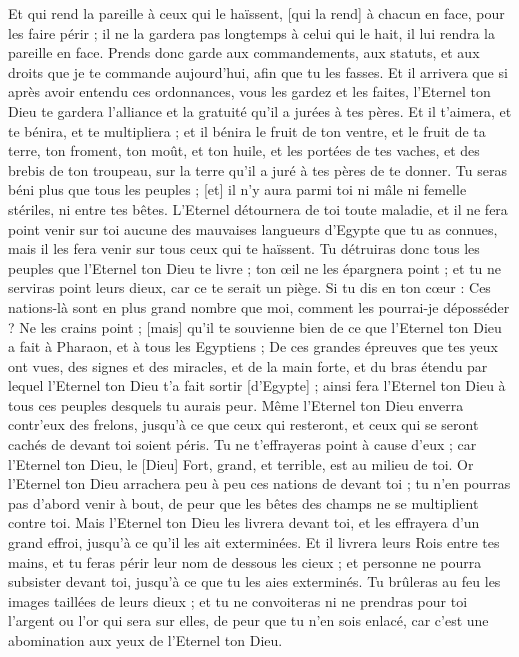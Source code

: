 \begin{multicols}{2}
Et qui rend la pareille à ceux qui le haïssent, [qui la rend] à chacun en face, pour les faire périr ; il ne la gardera pas longtemps à celui qui le hait, il lui rendra la pareille en face.
Prends donc garde aux commandements, aux statuts, et aux droits que je te commande aujourd'hui, afin que tu les fasses.
Et il arrivera que si après avoir entendu ces ordonnances, vous les gardez et les faites, l'Eternel ton Dieu te gardera l'alliance et la gratuité qu'il a jurées à tes pères.
Et il t'aimera, et te bénira, et te multipliera ; et il bénira le fruit de ton ventre, et le fruit de ta terre, ton froment, ton moût, et ton huile, et les portées de tes vaches, et des brebis de ton troupeau, sur la terre qu'il a juré à tes pères de te donner.
Tu seras béni plus que tous les peuples ; [et] il n'y aura parmi toi ni mâle ni femelle stériles, ni entre tes bêtes.
L'Eternel détournera de toi toute maladie, et il ne fera point venir sur toi aucune des mauvaises langueurs d'Egypte que tu as connues, mais il les fera venir sur tous ceux qui te haïssent.
Tu détruiras donc tous les peuples que l'Eternel ton Dieu te livre ; ton œil ne les épargnera point ; et tu ne serviras point leurs dieux, car ce te serait un piège.
Si tu dis en ton cœur : Ces nations-là sont en plus grand nombre que moi, comment les pourrai-je déposséder ?
Ne les crains point ; [mais] qu'il te souvienne bien de ce que l'Eternel ton Dieu a fait à Pharaon, et à tous les Egyptiens ;
De ces grandes épreuves que tes yeux ont vues, des signes et des miracles, et de la main forte, et du bras étendu par lequel l'Eternel ton Dieu t'a fait sortir [d'Egypte] ; ainsi fera l'Eternel ton Dieu à tous ces peuples desquels tu aurais peur.
Même l'Eternel ton Dieu enverra contr'eux des frelons, jusqu'à ce que ceux qui resteront, et ceux qui se seront cachés de devant toi soient péris.
Tu ne t'effrayeras point à cause d'eux ; car l'Eternel ton Dieu, le [Dieu] Fort, grand, et terrible, est au milieu de toi.
Or l'Eternel ton Dieu arrachera peu à peu ces nations de devant toi ; tu n'en pourras pas d'abord venir à bout, de peur que les bêtes des champs ne se multiplient contre toi.
Mais l'Eternel ton Dieu les livrera devant toi, et les effrayera d'un grand effroi, jusqu'à ce qu'il les ait exterminées.
Et il livrera leurs Rois entre tes mains, et tu feras périr leur nom de dessous les cieux ; et personne ne pourra subsister devant toi, jusqu'à ce que tu les aies exterminés.
Tu brûleras au feu les images taillées de leurs dieux ; et tu ne convoiteras ni ne prendras pour toi l'argent ou l'or qui sera sur elles, de peur que tu n'en sois enlacé, car c'est une abomination aux yeux de l'Eternel ton Dieu.

\end{multicols}
